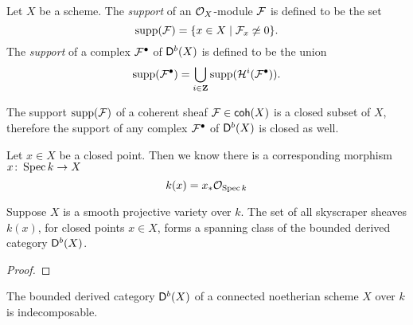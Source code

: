 \begin{definition}
    \label{Definition of support}
    Let $X$ be a scheme. The \emph{support} of an ${\mathcal{O}_{X}}$-module $\mathcal F$ is defined to be the set
    \[
        \operatorname{supp}(\mathcal F) = \{x \in X \mid \mathcal F_x \not\simeq 0 \}.
    \] 
    The \emph{support} of a complex $\mathcal F^\bullet$ of $\mathsf{D}^b(X)$ is defined to be the union
    \[
        \operatorname{supp}(\mathcal F^\bullet) = \bigcup_{i \in \mathbf Z} \operatorname{supp}(\mathcal H^i(\mathcal F^\bullet)).
    \]
\end{definition}

\begin{remark}
    \label{supports closed}
    The support $\operatorname{supp}(\mathcal F)$ of a coherent sheaf $\mathcal F \in \mathsf{coh}(X)$ is a closed subset of $X$, therefore the support of any complex $\mathcal F^\bullet$ of $\mathsf{D}^b(X)$ is closed as well.
\end{remark}

Let $x \in X$ be a closed point. Then we know there is a corresponding morphism $x \colon \operatorname{Spec}k \to X$ 
\[
    k(x) = x_* {\mathcal{O}_{\operatorname{Spec}k}}
\]

\begin{proposition}
    Suppose $X$ is a smooth projective variety over $k$. The set of all skyscraper sheaves $k(x)$, for closed points $x \in X$, forms a spanning class of the bounded derived category $\mathsf{D}^b(X)$.
\end{proposition}

\begin{proof}
    
\end{proof}

\begin{theorem}
    The bounded derived category $\mathsf{D}^b(X)$ of a connected noetherian scheme $X$ over $k$ is indecomposable.
\end{theorem}


